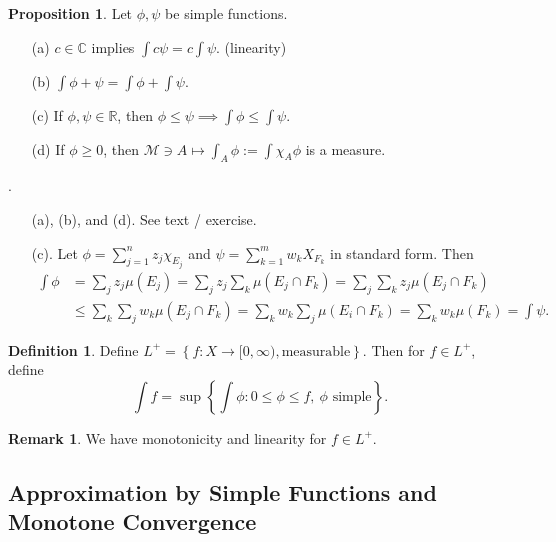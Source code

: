 \documentclass[11pt]{article}
\theoremstyle{definition}
\newtheorem{defn}{Definition}[section]
\newtheorem{prop}{Proposition}[section]
\newtheorem{remark}{Remark}[section]
\newcommand{\set}[1]{\left\{ #1 \right\}}
\newcommand{\RR}{\mathbb{R}}
\newcommand{\CC}{\mathbb{C}}
\newcommand{\m}[1]{\mathcal{#1}}
\begin{document}
\begin{prop}
  Let $\phi,\psi$ be simple functions. 
  \begin{enumerate}
    \item[(a)] $c\in\CC$ implies $\int c\psi = c\int\psi$. (linearity)
    \item[(b)] $\int\phi+\psi=\int\phi+\int\psi$. 
    \item[(c)] If $\phi,\psi\in\RR$, then $\phi\le\psi\implies\int{\phi}\le\int{\psi}$. 
    \item[(d)] If $\phi\ge0$, then $\m{M}\ni A\mapsto\int_A\phi:=\int\chi_A\phi$ is a
    measure.
  \end{enumerate}
\end{prop}

\proof .
\begin{enumerate}
  \item[] {\color{red} (a), (b), and (d). See text / exercise. }
  \item[] (c). Let $\phi=\sum_{j=1}^nz_j\chi_{E_j}$ and $\psi=\sum_{k=1}^mw_kX_{F_k}$ in
  standard form. Then 
  \begin{align*}
    \int\phi &= \sum_jz_j\mu(E_j) = \sum_jz_j\sum_k\mu(E_j\cap F_k) =
    \sum_j\sum_kz_j\mu(E_j\cap F_k) \\
    &\le \sum_k\sum_j w_k\mu(E_j\cap F_k)
    = \sum_kw_k\sum_j\mu(E_i\cap F_k) = \sum_kw_k\mu(F_k) = \int\psi .
  \end{align*}
\end{enumerate}
\qedhere

\begin{defn}
  Define $L^+=\set{f:X\to[0,\infty),\text{measurable}}$. Then for $f\in L^+$, define
  \[
    \int f = \sup\set{\int\phi : 0\le\phi\le f, ~\phi\text{ simple}} . 
  \]
\end{defn}

\begin{remark}
  We have monotonicity and linearity for $f\in L^+$. 
\end{remark}



\subsection{Approximation by Simple Functions and Monotone Convergence}
\end{document}
